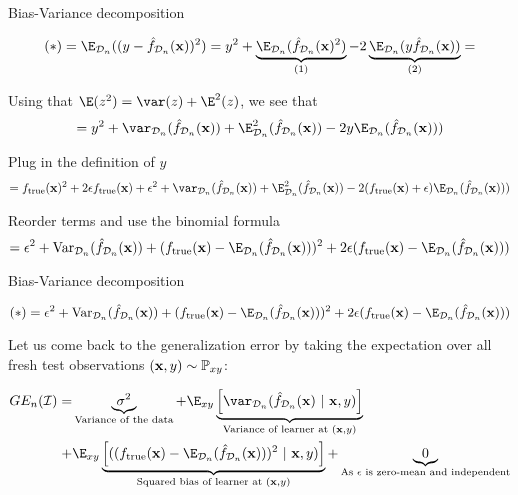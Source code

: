 \documentclass[11pt,compress,t,notes=noshow, xcolor=table]{beamer}
\begin{document}
\begin{frame2}[footnotesize]{Bias-Variance decomposition}

$$
(*) = \E_{\D_n}((y - \fh_{\D_n}(\xv))^2) = 
y^2 + \underbrace{\E_{\D_n}(\fh_{\D_n}(\xv)^2)}_{(1)}  - 2\underbrace{\E_{\D_n}(y\fh_{\D_n}(\xv))}_{(2)} =
$$

\vfill

Using that $\E(z^2) =\var(z) + \E^2(z)$, we see that
$$
= y^2 + \var_{\D_n}(\fh_{\D_n}(\xv)) + \E^2_{\D_n}(\fh_{\D_n}(\xv)) - 2y \E_{\D_n}(\fh_{\D_n}(\xv))) 
$$

\vfill

Plug in the definition of $y$
$$
= \ftrue(\xv)^2 +2\epsilon\ftrue(\xv) + \epsilon^2 + \var_{\D_n}(\fh_{\D_n}(\xv)) + \E^2_{\D_n}(\fh_{\D_n}(\xv)) - 2 (\ftrue(\xv)+\epsilon)\E_{\D_n}(\fh_{\D_n}(\xv))) 
$$

\vfill

Reorder terms and use the binomial formula
$$
= \epsilon^2 + \text{Var}_{\D_n}(\fh_{\D_n}(\xv)) + 
(\ftrue(\xv) - \E_{\D_n}(\fh_{\D_n}(\xv)))^2
+2 \epsilon (\ftrue(\xv) - \E_{\D_n}(\fh_{\D_n}(\xv)))
$$

\end{frame2}

\begin{frame2}[footnotesize]{Bias-Variance decomposition}

$$
(*) = \epsilon^2 + \text{Var}_{\D_n}(\fh_{\D_n}(\xv)) + 
(\ftrue(\xv) - \E_{\D_n}(\fh_{\D_n}(\xv)))^2
+2 \epsilon (\ftrue(\xv) - \E_{\D_n}(\fh_{\D_n}(\xv)))
$$

\vfill 

Let us come back to the generalization error by taking the expectation over all fresh test observations $(\mathbf{x}, y) \sim \mathbb{P}_{xy}$: 
\vfill

\begin{align*}
GE_n(\ind) 
=& \underbrace{\sigma^2}_{\text{Variance of the data}} + \E_{xy}\underbrace{\left[\var_{\D_n}(\fh_{\D_n}(\xv) ~|~\xv, y)\right]}_{\text{Variance of learner at } (\xv, y)} \\ 
+& \E_{xy}\underbrace{\left[((\ftrue(\xv)-\E_{\D_n}(\fh_{\D_n}(\xv)))^2~|~\xv, y)\right]}_{\text{Squared bias of learner at } (\xv, y)} + \underbrace{0}_{\text{As $\epsilon$ is zero-mean and independent}}
\end{align*}



\end{frame2}



\endlecture
\end{document}
